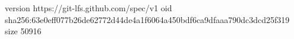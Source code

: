 version https://git-lfs.github.com/spec/v1
oid sha256:63e0eff077b26de62772d44de4a1f6064a450bdf6ca9dfaaa790dc3dcd25f319
size 50916
